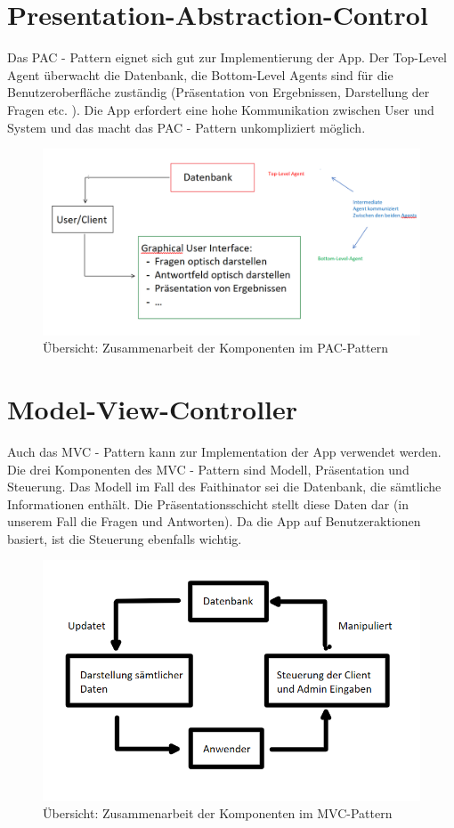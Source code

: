 \documentclass{scrreprt}
\begin{document}
\section{Presentation-Abstraction-Control}
Das PAC - Pattern eignet sich gut zur Implementierung der App. Der Top-Level Agent überwacht die Datenbank, die Bottom-Level Agents sind für die Benutzeroberfläche zuständig (Präsentation von Ergebnissen, Darstellung der Fragen etc. ). Die App erfordert eine hohe Kommunikation zwischen User und System und das macht das PAC - Pattern unkompliziert möglich.
\begin{figure}[ht]
 \includegraphics[width=\textwidth]{./pics/PAC.PNG}
 \caption{Übersicht: Zusammenarbeit der Komponenten im PAC-Pattern}
 \label{abb:1}
\end{figure}

\section{Model-View-Controller}
Auch das MVC -  Pattern kann zur Implementation der App verwendet werden. Die drei Komponenten des MVC - Pattern sind Modell, Präsentation und Steuerung. Das Modell im Fall des Faithinator sei die Datenbank, die sämtliche Informationen enthält. Die Präsentationsschicht stellt diese Daten dar (in unserem Fall die Fragen und Antworten). Da die App auf Benutzeraktionen basiert, ist die Steuerung ebenfalls wichtig.
\begin{figure}[ht]
 \includegraphics[width=\textwidth]{./pics/MVC.PNG}
 \caption{Übersicht: Zusammenarbeit der Komponenten im MVC-Pattern}
 \label{abb:2}
\end{figure}
\end{document}
